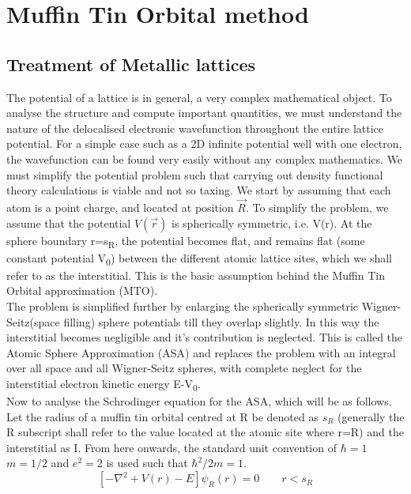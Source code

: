 \documentclass[12pt]{article}
\begin{document}
\clearpage
\section{Muffin Tin Orbital method}%
\subsection{Treatment of Metallic lattices}

The potential of a lattice is in general, a very complex mathematical object. To analyse the structure and compute important quantities, we must understand the nature of the delocalised electronic wavefunction throughout the entire lattice potential. For a simple case such as a 2D infinite potential well with one electron, the wavefunction can be found very easily without any complex mathematics. We must simplify the potential problem such that carrying out density functional theory calculations is viable and not so taxing. We start by assuming that each atom is a point charge, and located at position $\vec{R}$. To simplify the problem, we assume that the potential $V(\vec{r})$ is spherically symmetric, i.e. V(r). At the sphere boundary r=s\textsubscript{R}, the potential becomes flat, and remains flat (some constant potential V\textsubscript{0}) between the different atomic lattice sites, which we shall refer to as the interstitial. This is the basic assumption behind the Muffin Tin Orbital approximation (MTO). 
\\
The problem is simplified further by enlarging the spherically symmetric Wigner-Seitz(space filling) sphere potentials till they overlap slightly. In this way the interstitial becomes negligible and it's contribution is neglected. This is called the Atomic Sphere Approximation (ASA) and replaces the problem with an integral over all space and all Wigner-Seitz spheres, with complete neglect for the interstitial electron kinetic energy E-V\textsubscript{0}. 
\\
Now to analyse the Schrodinger equation for the ASA, which will be as follows. Let the radius of a muffin tin orbital centred at R be denoted as $s_R$ (generally the R subscript shall refer to the value located at the atomic site where r=R) and the interstitial as I. From here onwards, the standard unit convention of $\hbar=1$ $m=1/2$ and $e^2=2$ is used such that $\hbar^2/2m=1$.
\begin{equation} \tag{3.1}
[-\nabla^2+V(r)-E]\psi_R(r)=0 \qquad r<s_R 
\end{equation}
\end{document}
